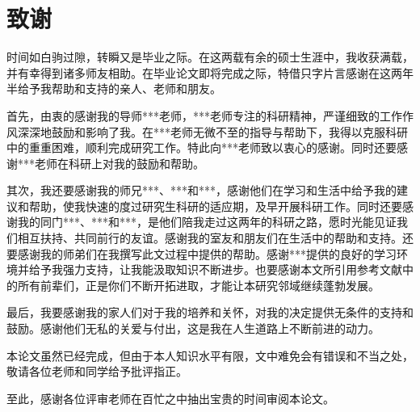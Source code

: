 \chapter[致谢]{致\ccwd{}谢}


时间如白驹过隙，转瞬又是毕业之际。在这两载有余的硕士生涯中，我收获满载，并有幸得到诸多师友相助。在毕业论文即将完成之际，特借只字片言感谢在这两年半给予我帮助和支持的亲人、老师和朋友。
\par
首先，由衷的感谢我的导师***老师，***老师专注的科研精神，严谨细致的工作作风深深地鼓励和影响了我。在***老师无微不至的指导与帮助下，我得以克服科研中的重重困难，顺利完成研究工作。特此向***老师致以衷心的感谢。同时还要感谢***老师在科研上对我的鼓励和帮助。
\par
其次，我还要感谢我的师兄***、***和***，感谢他们在学习和生活中给予我的建议和帮助，使我快速的度过研究生科研的适应期，及早开展科研工作。同时还要感谢我的同门***、***和***，是他们陪我走过这两年的科研之路，愿时光能见证我们相互扶持、共同前行的友谊。感谢我的室友和朋友们在生活中的帮助和支持。还要感谢我的师弟们在我撰写此文过程中提供的帮助。感谢***提供的良好的学习环境并给予我强力支持，让我能汲取知识不断进步。也要感谢本文所引用参考文献中的所有前辈们，正是你们不断开拓进取，才能让本研究邻域继续蓬勃发展。
\par
最后，我要感谢我的家人们对于我的培养和关怀，对我的决定提供无条件的支持和鼓励。感谢他们无私的关爱与付出，这是我在人生道路上不断前进的动力。
\par
本论文虽然已经完成，但由于本人知识水平有限，文中难免会有错误和不当之处，敬请各位老师和同学给予批评指正。
\par
至此，感谢各位评审老师在百忙之中抽出宝贵的时间审阅本论文。

